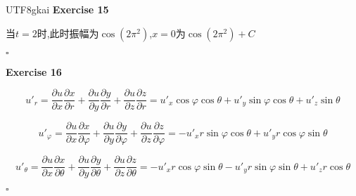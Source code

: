 \documentclass{article}
\newenvironment{exercise}[1]{%
{\textbf{Exercise #1} \\ 
    }
}{
  \hfill $\square$ 
  \par\bigskip 
}
\begin{document}
\begin{CJK}{UTF8}{gkai}
\begin{exercise}{15}
    当$t = 2$时,此时振幅为$\cos(2\pi^2)$,$x = 0$为$\cos(2\pi^2) + C$
    \begin{center}
    \end{center}

\end{exercise}

\begin{exercise}{16}
    \[u'_r = \frac{\partial u}{\partial x}\frac{\partial x}{\partial r} + \frac{\partial u}{\partial y}\frac{\partial y}{\partial r} + \frac{\partial u}{\partial z}\frac{\partial z}{\partial r} = u'_x \cos \varphi \cos \theta + u'_y \sin \varphi \cos \theta + u'_z \sin \theta\]

    \[u'_\varphi = \frac{\partial u}{\partial x}\frac{\partial x}{\partial \varphi} + \frac{\partial u}{\partial y}\frac{\partial y}{\partial \varphi} + \frac{\partial u}{\partial z}\frac{\partial z}{\partial \varphi} = - u'_x r \sin \varphi \cos \theta + u'_y r \cos \varphi \sin \theta \]

    \[u'_\theta = \frac{\partial u}{\partial x}\frac{\partial x}{\partial \theta} + \frac{\partial u}{\partial y}\frac{\partial y}{\partial \theta} + \frac{\partial u}{\partial z}\frac{\partial z}{\partial \theta} = - u'_x r \cos \varphi \sin \theta - u'_y r \sin \varphi \sin \theta + u'_z r \cos \theta\]


\end{exercise}
\end{CJK}
\end{document}
